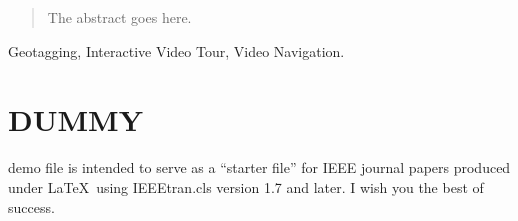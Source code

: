 \documentclass[journal]{IEEEtran}
\begin{document}







\maketitle


\begin{abstract}
The abstract goes here.
\end{abstract}

\begin{IEEEkeywords}
Geotagging, Interactive Video Tour, Video Navigation.
\end{IEEEkeywords}






%
\IEEEpeerreviewmaketitle



\section{DUMMY}
% 
% 
% 
% 
 demo file is intended to serve as a ``starter file''
for IEEE journal papers produced under \LaTeX\ using
IEEEtran.cls version 1.7 and later.
I wish you the best of success.
\end{document}
